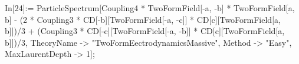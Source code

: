 In[24]:= ParticleSpectrum[Coupling4 * TwoFormField[-a, -b] * TwoFormField[a, b] - (2 * Coupling3 * CD[-b][TwoFormField[-a, -c]] * CD[c][TwoFormField[a, b]])/3 + (Coupling3 * CD[-c][TwoFormField[-a, -b]] * CD[c][TwoFormField[a, b]])/3, TheoryName -> "TwoFormEectrodynamicsMassive", Method -> "Easy", MaxLaurentDepth -> 1]; 